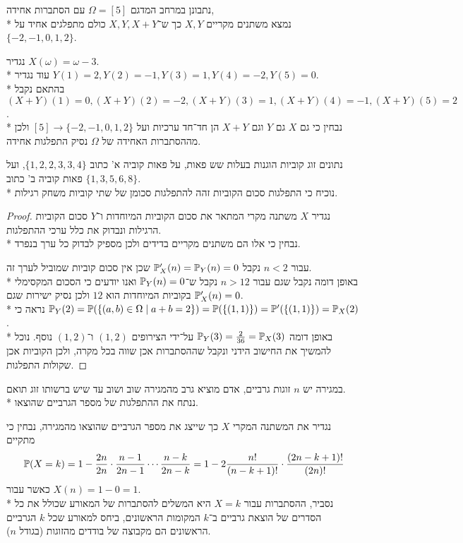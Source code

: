 \Question{}
נתבונן במרחב המדגם $\Omega = [5]$ עם הסתברות אחידה, \\*
נמצא משתנים מקריים $X, Y$ כך ש־$X, Y, X + Y$ כולם מתפלגים אחיד על $\{-2, -1, 0, 1, 2\}$.
\begin{solution}
	נגדיר $X(\omega) = \omega - 3$. \\*
	עוד נגדיר $Y(1) = 2, Y(2) = -1, Y(3) = 1, Y(4) = -2, Y(5) = 0$. \\*
	בהתאם נקבל $(X + Y)(1) = 0, (X + Y)(2) = -2, (X + Y)(3) = 1, (X + Y)(4) = -1, (X + Y)(5) = 2$. \\*
	נבחין כי גם $X$ גם $Y$ וגם $X + Y$ הן חד־חד ערכיות ועל $[5] \to \{-2, -1, 0, 1, 2\}$ ולכן מההסתברות האחידה של $\Omega$ נסיק התפלגות אחידה.
\end{solution}

\Question{}
נתונים זוג קוביות הוגנות בעלות שש פאות, על פאות קוביה א' כתוב $\{1, 2, 2, 3, 3, 4\}$, ועל פאות קוביה ב' כתוב $\{1, 3, 5, 6, 8\}$. \\*
נוכיח כי התפלגות סכום הקוביות זהה להתפלגות סכומן של שתי קוביות משחק רגילות.
\begin{proof}
	נגדיר $X$ משתנה מקרי המתאר את סכום הקוביות המיוחדות ו־$Y$ סכום הקוביות הרגילות ונבדוק את כלל ערכי ההתפלגות. \\*
	נבחין כי אלו הם משתנים מקריים בדידים ולכן מספיק לבדוק כל ערך בנפרד.

	עבור $n < 2$ נקבל $\mathbb{P}_X'(n) = \mathbb{P}_Y(n) = 0$ שכן אין סכום קוביות שמוביל לערך זה. \\*
	באופן דומה נקבל שגם עבור $n > 12$ נקבל ש־$\mathbb{P}_Y(n) = 0$ ואנו יודעים כי הסכום המקסימלי בקוביות המיוחדות הוא $12$ ולכן נסיק ישירות שגם $\mathbb{P}_X'(n) = 0$. \\*
	נראה כי $\mathbb{P}_Y(2) = \mathbb{P}(\{(a, b) \in \Omega \mid a + b = 2\}) = \mathbb{P}(\{ (1, 1) \}) = \mathbb{P}'(\{ (1, 1) \}) = \mathbb{P}_X(2)$. \\*
	באופן דומה $\mathbb{P}_Y(3) = \frac{2}{36} = \mathbb{P}_X(3)$ על־ידי הצירופים $(1, 2)$ ו־$(1, 2)$ נוסף.
	נוכל להמשיך את החישוב הידני ונקבל שההסתברות אכן שווה בכל מקרה, ולכן הקוביות אכן שקולות התפלגות.
\end{proof}

\Question{}
במגירה יש $n$ זוגות גרביים, אדם מוציא גרב מהמגירה שוב ושוב עד שיש ברשותו זוג תואם. \\*
ננתח את ההתפלגות של מספר הגרביים שהוצאו.
\begin{solution}
	נגדיר את המשתנה המקרי $X$ כך שייצג את מספר הגרביים שהוצאו מהמגירה, נבחין כי מתקיים
	\[
		\mathbb{P}(X = k) = 1 - \frac{2n}{2n} \cdot \frac{n - 1}{2n - 1} \cdots \frac{n - k}{2n - k} = 1 - 2 \frac{n!}{(n - k + 1)!} \cdot \frac{(2n - k + 1)!}{(2n)!}
	\]
	כאשר עבור $X(n) = 1 - 0 = 1$. \\*
	נסביר, ההסתברות עבור $X = k$ היא המשלים להסתברות של המאורע שכולל את כל הסדרים של הוצאת גרביים ב־$k$ המקומות הראשונים, ביחס למאורע שכל $k$ הגרביים הראשונים הם מקבוצה של בודדים מהזוגות (בגודל $n$).
\end{solution}

